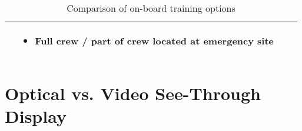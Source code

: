 \begin{table}[h]
\begin{tabular}{@{}p{2.2cm}|p{3cm}|p{3cm}|p{3cm}|@{}}
\begin{itemize}[leftmargin=*,topsep=0pt,align=left,itemsep=0.25pt,after=]
		\end{itemize}
		& \vspace{-2mm} \begin{itemize}[leftmargin=*,topsep=0pt,align=left,itemsep=0.25pt,after=]
			\renewcommand{\labelitemi}{\scalebox{.9}{\tiny\listsymb}}
			\item Full crew / part of crew located at emergency site
		\end{itemize} \\
		\bottomrule
	\end{tabular}
\caption{Comparison of on-board training options}
\label{tab:trainingoptions}
\end{table}
\newpage
\section{Optical vs. Video See-Through Display}
